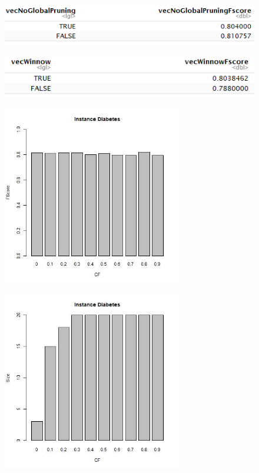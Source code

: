 \documentclass[12pt,a4paper]{article}
\begin{document}
\begin{figure}[H]
\centering
\includegraphics{diabetesDFnoGlobalPruning.PNG}
\end{figure}

\begin{figure}[H]
\centering
\includegraphics{diabetesDFwinnow.PNG}
\end{figure}

\begin{figure}[H]
\centering
\includegraphics[width=0.7\textwidth]{diabetesFScoreCF.jpg}
\end{figure}

\begin{figure}[H]
\centering
\includegraphics[width=0.7\textwidth]{diabetesSizeCF.jpg}
\end{figure}
\end{document}
